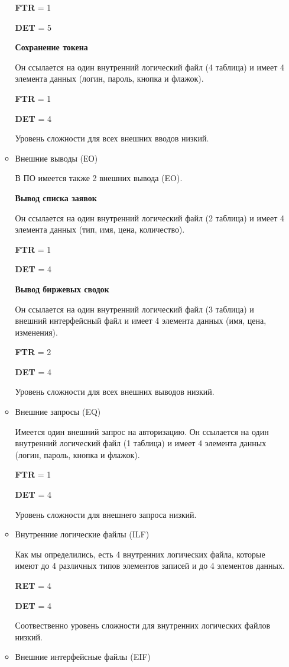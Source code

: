 \documentclass[a4paper,14pt]{extreport} %
\begin{document}
\begin{enumerate}
\begin{itemize}
\textbf{FTR} = 1

\textbf{DET} = 5

\textbf{Сохранение токена}

Он ссылается на один внутренний логический файл (4 таблица) и имеет 4 элемента данных (логин, пароль, кнопка и флажок).

\textbf{FTR} = 1

\textbf{DET} = 4

Уровень сложности для всех внешних вводов низкий.

\item Внешние выводы (ЕО)

В ПО имеется также 2 внешних вывода (EO).

\textbf{Вывод списка заявок} 

Он ссылается на один внутренний логический файл (2 таблица) и имеет 4 элемента данных (тип, имя, цена, количество).

\textbf{FTR} = 1

\textbf{DET} = 4

\textbf{Вывод биржевых сводок}

Он ссылается на один внутренний логический файл (3 таблица) и внешний интерфейсный файл и имеет 4 элемента данных (имя, цена, изменения).

\textbf{FTR} = 2

\textbf{DET} = 4

Уровень сложности для всех внешних выводов низкий.

\item Внешние запросы (EQ)

Имеется один внешний запрос на авторизацию.
Он ссылается на один внутренний логический файл (1 таблица) и имеет 4 элемента данных (логин, пароль, кнопка и флажок).

\textbf{FTR} = 1

\textbf{DET} = 4

Уровень сложности для внешнего запроса низкий.

\item Внутренние логические файлы (ILF)

Как мы определились, есть 4 внутренних логических файла, которые имеют до 4 различных типов элементов записей и до 4 элементов данных.

\textbf{RET} = 4

\textbf{DET} = 4

Соотвественно уровень сложности для внутренних логических файлов низкий.

\item Внешние интерфейсные файлы (EIF)


\end{itemize}
\end{enumerate}
\end{document}
